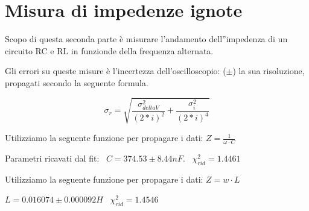 %
%
%
%
%

\section{Misura di impedenze ignote}

Scopo di questa seconda parte è misurare l'andamento dell''impedenza di un circuito RC e RL in funzionde della frequenza alternata.

Gli errori su queste misure è l'incertezza dell'oscilloscopio: ($\pm$) la sua risoluzione, propagati secondo la seguente formula.

$$\sigma_r = \sqrt{\frac{\sigma_{deltaV}^2}{(2*i)^2} + \frac{\sigma_{i}^2}{(2*i)^4}}$$


Utilizziamo la seguente funzione per propagare i dati:
$Z = \frac{1}{\omega \cdot C}$

\begin{center}
\end{center}
Parametri ricavati dal fit:
\
$C = 374.53\pm 8.44 nF$.
\
$\chi_{rid}^2= 1.4461 $ 


Utilizziamo la seguente funzione per propagare i dati:
$Z = w\cdot L$

\begin{center}
\end{center}

$L = 0.016074\pm 0.000092 H$ \
$\chi_{rid}^2 = 1.4546$ 




